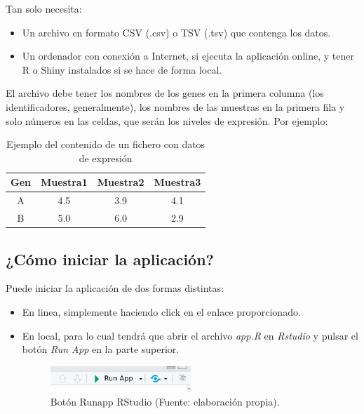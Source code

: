 Tan solo necesita:

\begin{itemize}
    \item Un archivo en formato CSV (.csv) o TSV (.tsv) que contenga los datos.
    \item Un ordenador con conexión a Internet, si ejecuta la aplicación online, y tener R o Shiny instalados si se hace de forma local.
\end{itemize}

El archivo debe tener los nombres de los genes en la primera columna (los identificadores, generalmente), los nombres de las muestras en la primera
fila y solo números en las celdas, que serán los niveles de expresión. Por ejemplo:

\begin{table}[h!]
    \centering
    \begin{tabular}{|c|c|c|c|}
    \hline
    \textbf{Gen} & \textbf{Muestra1} & \textbf{Muestra2} & \textbf{Muestra3} \\
    \hline
    A & 4.5 & 3.9 & 4.1 \\
    B & 5.0 & 6.0 & 2.9 \\
    \hline
    \end{tabular}
    \caption{Ejemplo del contenido de un fichero con datos de expresión}
\end{table}
    

\subsection{¿Cómo iniciar la aplicación?}

Puede iniciar la aplicación de dos formas distintas:
\begin{itemize}
    \item En linea, simplemente haciendo click en el enlace proporcionado.
    \item En local, para lo cual tendrá que abrir el archivo \textit{app.R} en \textit{
        Rstudio} y pulsar el botón \textit{Run App} en la parte superior.
        \begin{figure}[h]
            \centering
            \includegraphics[width=0.5\textwidth]{../img/runapp.png}
            \caption{Botón Runapp RStudio (Fuente: elaboración propia).}
        \end{figure}
\end{itemize}

